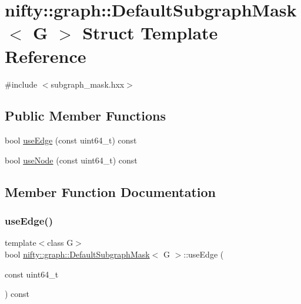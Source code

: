 \hypertarget{structnifty_1_1graph_1_1DefaultSubgraphMask}{}\section{nifty\+:\+:graph\+:\+:Default\+Subgraph\+Mask$<$ G $>$ Struct Template Reference}
\label{structnifty_1_1graph_1_1DefaultSubgraphMask}


{\ttfamily \#include $<$subgraph\+\_\+mask.\+hxx$>$}

\subsection*{Public Member Functions}
\begin{DoxyCompactItemize}
\item 
bool \hyperlink{structnifty_1_1graph_1_1DefaultSubgraphMask_aa2cdbeab0e2d5fefe8c88327e2f63f43}{use\+Edge} (const uint64\+\_\+t) const
\item 
bool \hyperlink{structnifty_1_1graph_1_1DefaultSubgraphMask_a2feccc1074a9af42321314a545f57c2e}{use\+Node} (const uint64\+\_\+t) const
\end{DoxyCompactItemize}


\subsection{Member Function Documentation}
\mbox{\label{structnifty_1_1graph_1_1DefaultSubgraphMask_aa2cdbeab0e2d5fefe8c88327e2f63f43}} 
\subsubsection{\texorpdfstring{use\+Edge()}{useEdge()}}
{\footnotesize\ttfamily template$<$class G$>$ \\
bool \hyperlink{structnifty_1_1graph_1_1DefaultSubgraphMask}{nifty\+::graph\+::\+Default\+Subgraph\+Mask}$<$ G $>$\+::use\+Edge (\begin{DoxyParamCaption}\item[{const uint64\+\_\+t}]{ }\end{DoxyParamCaption}) const\hspace{0.3cm}{\ttfamily [inline]}}

